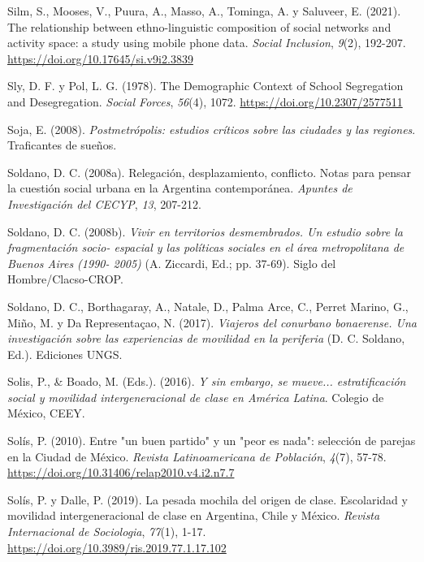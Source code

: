 \documentclass[
  spanish,
  a4paper,%
  chapterprefix=true,%
  DIV=calc,%
  twoside]{scrbook}%
\newlength{\cslhangindent}
\newenvironment{CSLReferences}[2] %
 {\begin{list}{}{%
  \setlength{\itemindent}{0pt}
  \setlength{\leftmargin}{0pt}
  \setlength{\parsep}{0pt}
  \ifodd #1
   \setlength{\leftmargin}{\cslhangindent}
   \setlength{\itemindent}{-1\cslhangindent}
  \fi
  \setlength{\itemsep}{#2\baselineskip}}}
 {\end{list}}
\begin{document}
\begin{CSLReferences}{1}{0}
Silm, S., Mooses, V., Puura, A., Masso, A., Tominga, A. y Saluveer, E. (2021). The relationship between ethno-linguistic composition of social networks and activity space: a study using mobile phone data. \emph{Social Inclusion}, \emph{9}(2), 192-207. \url{https://doi.org/10.17645/si.v9i2.3839}

Sly, D. F. y Pol, L. G. (1978). The Demographic Context of School Segregation and Desegregation. \emph{Social Forces}, \emph{56}(4), 1072. \url{https://doi.org/10.2307/2577511}

Soja, E. (2008). \emph{Postmetrópolis: estudios críticos sobre las ciudades y las regiones}. Traficantes de sueños.

Soldano, D. C. (2008a). Relegación, desplazamiento, conflicto. Notas para pensar la cuestión social urbana en la Argentina contemporánea. \emph{Apuntes de Investigación del CECYP}, \emph{13}, 207-212.

Soldano, D. C. (2008b). \emph{Vivir en territorios desmembrados. Un estudio sobre la fragmentación socio- espacial y las políticas sociales en el área metropolitana de Buenos Aires (1990- 2005)} (A. Ziccardi, Ed.; pp. 37-69). Siglo del Hombre/Clacso-CROP.

Soldano, D. C., Borthagaray, A., Natale, D., Palma Arce, C., Perret Marino, G., Miño, M. y Da Representaçao, N. (2017). \emph{Viajeros del conurbano bonaerense. Una investigación sobre las experiencias de movilidad en la periferia} (D. C. Soldano, Ed.). Ediciones UNGS.

Solis, P., \& Boado, M. (Eds.). (2016). \emph{Y sin embargo, se mueve... estratificación social y movilidad intergeneracional de clase en América Latina}. Colegio de México, CEEY.

Solís, P. (2010). Entre {"}un buen partido{"} y un {"}peor es nada{"}: selección de parejas en la Ciudad de México. \emph{Revista Latinoamericana de Población}, \emph{4}(7), 57-78. \url{https://doi.org/10.31406/relap2010.v4.i2.n7.7}

Solís, P. y Dalle, P. (2019). La pesada mochila del origen de clase. Escolaridad y movilidad intergeneracional de clase en Argentina, Chile y México. \emph{Revista Internacional de Sociologia}, \emph{77}(1), 1-17. \url{https://doi.org/10.3989/ris.2019.77.1.17.102}


\end{CSLReferences}
\end{document}
